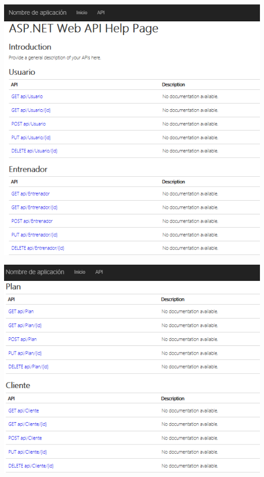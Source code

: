         \begin{center}
			\includegraphics[width=15cm]{./Imagenes/2}
             \end{center}
        \begin{center}
			\includegraphics[width=15cm]{./Imagenes/3}
             \end{center}
